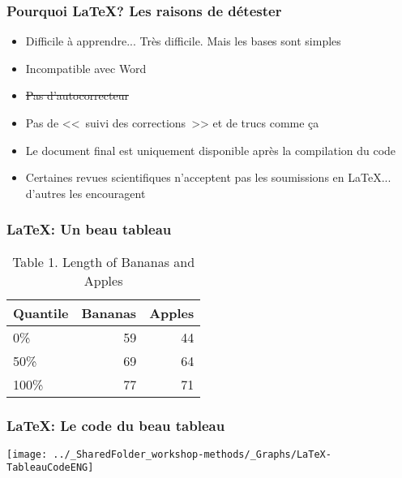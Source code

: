 \documentclass{beamer}
\begin{document}
    \begin{frame}
        \frametitle{Pourquoi \LaTeX? Les raisons de détester} \vspace{1cm}
        \begin{itemize}
           \item{Difficile à apprendre... Très difficile. Mais les bases sont simples}
           \item{Incompatible avec Word}
           \item{\sout{Pas d'autocorrecteur}}
           \item{Pas de <<~suivi des corrections~>> et de trucs comme ça}
           \item{Le document final est uniquement disponible après la compilation du code}
           \item{Certaines revues scientifiques n'acceptent pas les soumissions en \LaTeX{}... d'autres les encouragent}
        \end{itemize} 
    \end{frame}

    \begin{frame}
        \frametitle{\LaTeX: Un beau tableau} \vspace{1cm}   
            \begin{table}
              \centering
              \normalsize
              \caption{\large{Table 1. Length of Bananas and Apples}}
              \begin{tabular}{lrr}
                  Quantile & Bananas & Apples\\\hline 
                  0\% & 59 & 44\\
                  50\% &69&64\\
                  100\% & 77 & 71\\
              \end{tabular}
              \label{tab:bananespommes}
            \end{table}  
    \end{frame}
    
    \begin{frame}
        \frametitle{\LaTeX: Le code du beau tableau} \vspace{1cm}   
        \begin{center}
           \texttt{[image: ../\_SharedFolder\_workshop-methods/\_Graphs/LaTeX-TableauCodeENG]}
        \end{center}  
    \end{frame}
    
\end{document}
